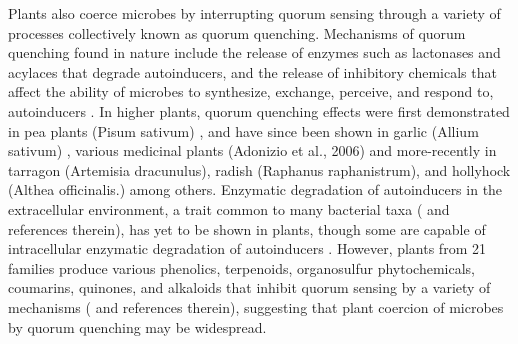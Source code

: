 \documentclass[PhD]{msu-thesis}
\begin{document}
Plants also coerce microbes by interrupting quorum sensing through a variety of processes collectively known as quorum quenching. Mechanisms of quorum quenching found in nature include the release of enzymes such as lactonases and acylaces that degrade autoinducers, and the release of inhibitory chemicals that affect the ability of microbes to synthesize, exchange, perceive, and respond to, autoinducers \cite{grandclement2016}. In higher plants, quorum quenching effects were first demonstrated in pea plants (Pisum sativum)  \cite{teplitski2000}, and have since been shown in garlic (Allium sativum) \cite{rasmussen2006}, various medicinal plants (Adonizio et al., 2006) and more-recently in tarragon (Artemisia dracunulus), radish (Raphanus raphanistrum), and hollyhock (Althea officinalis.) \cite{mahmoudi2014} among others. Enzymatic degradation of autoinducers in the extracellular environment, a trait common to many bacterial taxa (\cite{rasmussen2015} and references therein), has yet to be shown in plants, though some are capable of intracellular enzymatic degradation of autoinducers \cite{palmer2014}. However, plants from 21 families produce various phenolics, terpenoids, organosulfur phytochemicals, coumarins, quinones, and alkaloids that inhibit quorum sensing by a variety of mechanisms (\cite{ta2016} and references therein), suggesting that plant coercion of microbes by quorum quenching may be widespread.
\end{document}
